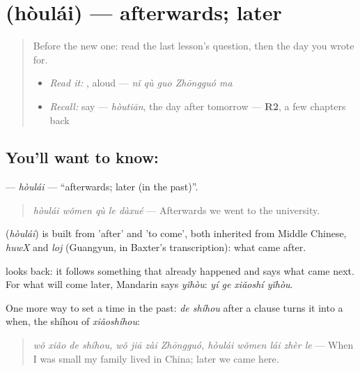 \section[\texorpdfstring{\zh{后来} (hòulái)}{后来 (hòulái)}]{ (hòulái) — afterwards; later}

\label{lesson:ZH-C150-houlai}



\begin{quote}
Before the new one: read the last lesson's question, then the day you wrote  for.

\begin{itemize}
\raggedright
  \item \emph{Read it:} , aloud — \emph{nǐ qù guo Zhōngguó ma}
  \item \emph{Recall:} say  — \emph{hòutiān}, the day after tomorrow — \textbf{R2}, a few chapters back
\end{itemize}
\end{quote}

\subsection*{You'll want to know: }
\textbf{} — \emph{hòulái} — \textquotedblleft{}afterwards; later (in the past)\textquotedblright{}.

\begin{quote}
\textbf{} \emph{hòulái wǒmen qù le dàxué} — Afterwards we went to the university.
\end{quote}

\begin{cousinweb}
\textbf{} (\emph{hòulái}) is built from  'after' and  'to come', both inherited from Middle Chinese, \emph{huwX} and \emph{loj} (Guangyun, in Baxter's transcription): what came after.
\end{cousinweb}

\begin{grammarlens}[title={What you've built}]
 looks back: it follows something that already happened and says what came next. For what will come later, Mandarin says \emph{yǐhòu}: \emph{yí ge xiǎoshí yǐhòu}.

One more way to set a time in the past: \emph{de shíhou} after a clause turns it into a when, the shíhou of \emph{xiǎoshíhou}:

\begin{quote}
\emph{wǒ xiǎo de shíhou, wǒ jiā zài Zhōngguó, hòulái wǒmen lái zhèr le} — When I was small my family lived in China; later we came here.
\end{quote}
\end{grammarlens}

